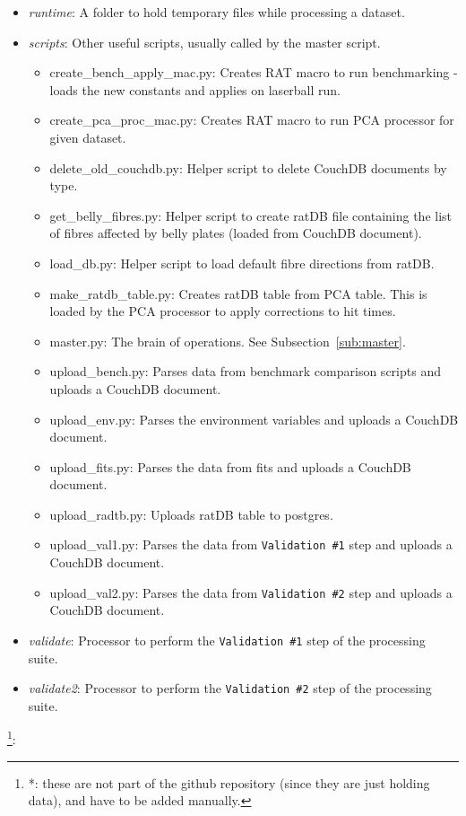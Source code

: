 \documentclass[12pt]{article}
\begin{document}
\begin{itemize}
\begin{itemize}
		\item \textit{runtime}: A folder to hold temporary files while processing a dataset.
		\item \textit{scripts}: Other useful scripts, usually called by the master script.
		\begin{itemize}
			\item create\_bench\_apply\_mac.py: Creates RAT macro to run benchmarking - loads the new constants and applies on laserball run.
			\item create\_pca\_proc\_mac.py: Creates RAT macro to run PCA processor for given dataset.
			\item delete\_old\_couchdb.py: Helper script to delete CouchDB documents by type.
			\item get\_belly\_fibres.py: Helper script to create ratDB file containing the list of fibres affected by belly plates (loaded from CouchDB document).
			\item load\_db.py: Helper script to load default fibre directions from ratDB.
			\item make\_ratdb\_table.py: Creates ratDB table from PCA table. This is loaded by the PCA processor to apply corrections to hit times.
			\item master.py: The brain of operations. See Subsection~\ref{sub:master}.
			\item upload\_bench.py: Parses data from benchmark comparison scripts and uploads a CouchDB document.
			\item upload\_env.py: Parses the environment variables and uploads a CouchDB document.
			\item upload\_fits.py: Parses the data from fits and uploads a CouchDB document.
			\item upload\_radtb.py: Uploads ratDB table to postgres. 
			\item upload\_val1.py: Parses the data from \texttt{Validation \#1} step and uploads a CouchDB document.
			\item upload\_val2.py: Parses the data from \texttt{Validation \#2} step and uploads a CouchDB document.
		\end{itemize}
		\item \textit{validate}: Processor to perform the \texttt{Validation \#1} step of the processing suite.
		\item \textit{validate2}: Processor to perform the \texttt{Validation \#2} step of the processing suite.
	\end{itemize}
\end{itemize}
\footnote{*: these are not part of the github repository (since they are just holding data), and have to be added manually.}:
\end{document}
